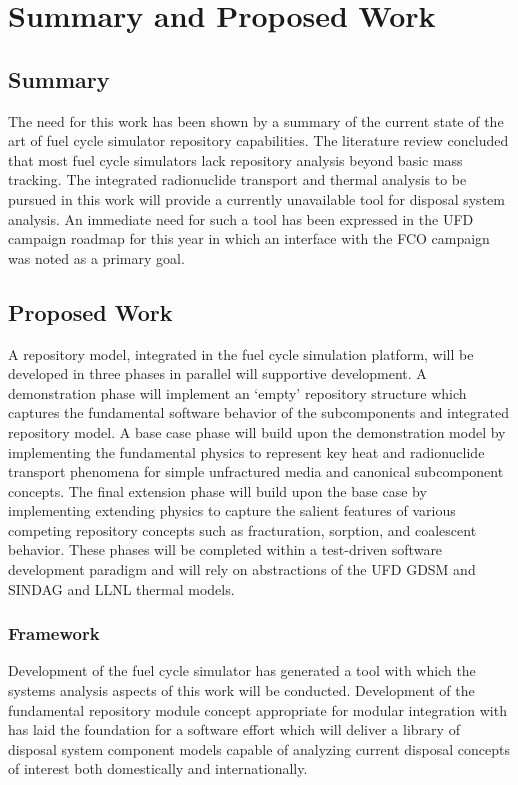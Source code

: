 \chapter{Summary and Proposed Work}\label{ch:future}

\section{Summary}

The need for this work has been shown by a summary of the current state of the 
art of fuel cycle simulator repository capabilities. The literature review 
concluded that most fuel cycle simulators lack repository analysis beyond basic 
mass tracking. The integrated radionuclide transport and thermal analysis to be 
pursued in this work will provide a currently unavailable tool for disposal 
system analysis. An immediate need for such a tool has been expressed in the 
\gls{UFD} campaign roadmap for this year in which an interface with the \gls{FCO} 
campaign was noted as a primary goal. 

\section{Proposed Work}

A repository model, integrated in the \Cyclus fuel cycle simulation platform, 
will be developed in three phases in parallel will supportive \Cyclus 
development. A demonstration phase will implement an `empty' repository 
structure which captures the fundamental software behavior of the subcomponents 
and integrated repository model. A base case phase will build upon the 
demonstration model by implementing the fundamental physics to represent key heat 
and radionuclide transport phenomena for simple unfractured media and canonical  
subcomponent concepts. The final extension phase will build upon the base case 
by implementing extending physics to capture the salient features of various 
competing repository concepts such as fracturation, sorption, and coalescent 
behavior. These phases will be completed within a test-driven software 
development paradigm and will rely on abstractions of the \gls{UFD} \gls{GDSM} 
and \gls{SINDAG} and \gls{LLNL} thermal models.  

\subsection{\Cyclus Framework}

Development of the \Cyclus fuel cycle simulator has generated a tool with which 
the systems analysis aspects of this work will be conducted. Development of the  
fundamental repository module concept appropriate for modular integration with 
\Cyclus has laid the foundation for a software effort which will deliver a 
library of disposal system component models capable of analyzing current 
disposal concepts of interest both domestically and internationally.

